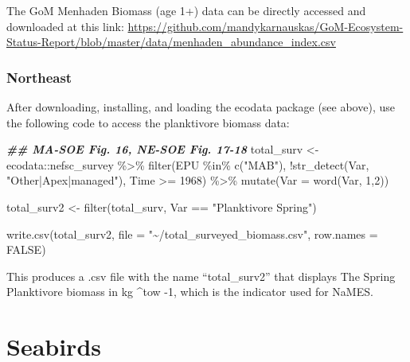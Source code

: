 \documentclass[
]{book}
\newenvironment{Shaded}{\begin{snugshade}}{\end{snugshade}}
\newcommand{\AttributeTok}[1]{\textcolor[rgb]{0.77,0.63,0.00}{#1}}
\newcommand{\ConstantTok}[1]{\textcolor[rgb]{0.00,0.00,0.00}{#1}}
\newcommand{\DecValTok}[1]{\textcolor[rgb]{0.00,0.00,0.81}{#1}}
\newcommand{\DocumentationTok}[1]{\textcolor[rgb]{0.56,0.35,0.01}{\textbf{\textit{#1}}}}
\newcommand{\FunctionTok}[1]{\textcolor[rgb]{0.00,0.00,0.00}{#1}}
\newcommand{\NormalTok}[1]{#1}
\newcommand{\OtherTok}[1]{\textcolor[rgb]{0.56,0.35,0.01}{#1}}
\newcommand{\SpecialCharTok}[1]{\textcolor[rgb]{0.00,0.00,0.00}{#1}}
\newcommand{\StringTok}[1]{\textcolor[rgb]{0.31,0.60,0.02}{#1}}
\begin{document}
The GoM Menhaden Biomass (age 1+) data can be directly accessed and downloaded at this link: \url{https://github.com/mandykarnauskas/GoM-Ecosystem-Status-Report/blob/master/data/menhaden_abundance_index.csv}

\hypertarget{northeast-1}{%
\subsection{Northeast}\label{northeast-1}}

After downloading, installing, and loading the ecodata package (see above), use the following code to access the planktivore biomass data:

\begin{Shaded}
\begin{Highlighting}[]
\DocumentationTok{\#\# MA{-}SOE Fig. 16, NE{-}SOE Fig. 17{-}18}
\NormalTok{total\_surv }\OtherTok{\textless{}{-}}\NormalTok{ ecodata}\SpecialCharTok{::}\NormalTok{nefsc\_survey }\SpecialCharTok{\%\textgreater{}\%}
  \FunctionTok{filter}\NormalTok{(EPU }\SpecialCharTok{\%in\%} \FunctionTok{c}\NormalTok{(}\StringTok{"MAB"}\NormalTok{),}
         \SpecialCharTok{!}\FunctionTok{str\_detect}\NormalTok{(Var, }\StringTok{"Other|Apex|managed"}\NormalTok{),}
\NormalTok{         Time }\SpecialCharTok{\textgreater{}=} \DecValTok{1968}\NormalTok{) }\SpecialCharTok{\%\textgreater{}\%}
  \FunctionTok{mutate}\NormalTok{(}\AttributeTok{Var =} \FunctionTok{word}\NormalTok{(Var, }\DecValTok{1}\NormalTok{,}\DecValTok{2}\NormalTok{))}

\NormalTok{total\_surv2 }\OtherTok{\textless{}{-}} \FunctionTok{filter}\NormalTok{(total\_surv, Var }\SpecialCharTok{==} \StringTok{"Planktivore Spring"}\NormalTok{)}

\FunctionTok{write.csv}\NormalTok{(total\_surv2, }\AttributeTok{file =} \StringTok{"\textasciitilde{}/total\_surveyed\_biomass.csv"}\NormalTok{, }\AttributeTok{row.names =} \ConstantTok{FALSE}\NormalTok{)}
\end{Highlighting}
\end{Shaded}

This produces a .csv file with the name ``total\_surv2'' that displays The Spring Planktivore biomass in kg \^{}tow -1, which is the indicator used for NaMES.

\hypertarget{seabirds}{%
\chapter{Seabirds}\label{seabirds}}
\end{document}
